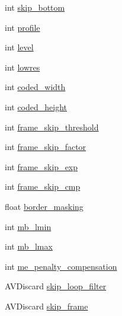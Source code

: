 \begin{DoxyCompactItemize}
int \hyperlink{struct_tao_1_1_f_fmpeg_1_1_f_fmpeg_1_1_a_v_codec_context_ac58332fd0b490e059d21d2fada767f25}{skip\_\-bottom}
\item 
int \hyperlink{struct_tao_1_1_f_fmpeg_1_1_f_fmpeg_1_1_a_v_codec_context_ad62065e63bb7be68b6c6b077aab2d99e}{profile}
\item 
int \hyperlink{struct_tao_1_1_f_fmpeg_1_1_f_fmpeg_1_1_a_v_codec_context_aa1b133cf61b525ab7989d0d08baaa06c}{level}
\item 
int \hyperlink{struct_tao_1_1_f_fmpeg_1_1_f_fmpeg_1_1_a_v_codec_context_a9bc5f49b3ed32fe8b63480c98620bffa}{lowres}
\item 
int \hyperlink{struct_tao_1_1_f_fmpeg_1_1_f_fmpeg_1_1_a_v_codec_context_a461b1a630112ab3e27e22ab2dc11aefc}{coded\_\-width}
\item 
int \hyperlink{struct_tao_1_1_f_fmpeg_1_1_f_fmpeg_1_1_a_v_codec_context_a6796a6bc177530c05f5e0599c3423464}{coded\_\-height}
\item 
int \hyperlink{struct_tao_1_1_f_fmpeg_1_1_f_fmpeg_1_1_a_v_codec_context_a5eb92b636e755c75e9c7cf80113505af}{frame\_\-skip\_\-threshold}
\item 
int \hyperlink{struct_tao_1_1_f_fmpeg_1_1_f_fmpeg_1_1_a_v_codec_context_a0368864715fb8b34f45b1f3f41c3cded}{frame\_\-skip\_\-factor}
\item 
int \hyperlink{struct_tao_1_1_f_fmpeg_1_1_f_fmpeg_1_1_a_v_codec_context_a2f9bc3243bf801b53e52231160e60308}{frame\_\-skip\_\-exp}
\item 
int \hyperlink{struct_tao_1_1_f_fmpeg_1_1_f_fmpeg_1_1_a_v_codec_context_a2408e33bb5a7e6131a450db2437b74ca}{frame\_\-skip\_\-cmp}
\item 
float \hyperlink{struct_tao_1_1_f_fmpeg_1_1_f_fmpeg_1_1_a_v_codec_context_a47d06f0349212a16761d391261d38473}{border\_\-masking}
\item 
int \hyperlink{struct_tao_1_1_f_fmpeg_1_1_f_fmpeg_1_1_a_v_codec_context_a1c86ad19c332a736fc03b0b6718198bc}{mb\_\-lmin}
\item 
int \hyperlink{struct_tao_1_1_f_fmpeg_1_1_f_fmpeg_1_1_a_v_codec_context_a1a6ed6ecae4c82114f1f54d4d4a71b97}{mb\_\-lmax}
\item 
int \hyperlink{struct_tao_1_1_f_fmpeg_1_1_f_fmpeg_1_1_a_v_codec_context_a4a6c467e1ec3df7cc0172fe317bc1cb8}{me\_\-penalty\_\-compensation}
\item 
AVDiscard \hyperlink{struct_tao_1_1_f_fmpeg_1_1_f_fmpeg_1_1_a_v_codec_context_acc2c5f476a89696bb8b61b052860c8a4}{skip\_\-loop\_\-filter}
\item 
AVDiscard \hyperlink{struct_tao_1_1_f_fmpeg_1_1_f_fmpeg_1_1_a_v_codec_context_a790b9eb336d9d8983b8b5246bf596136}{skip\_\-frame}

\end{DoxyCompactItemize}
